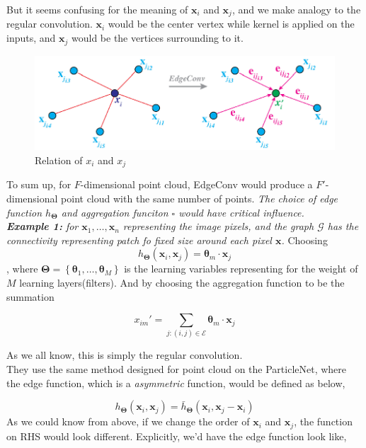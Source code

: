 \documentclass[12pt]{article}
\numberwithin{equation}{section}
\begin{document}
But it seems confusing for the meaning of $\mathbf{x}_i$ and $\mathbf{x}_j$, and we make analogy to the regular convolution. $\mathbf{x}_i$ would be the center vertex while kernel is applied on the inputs, and $\mathbf{x}_j$ would be the vertices surrounding to it.

\begin{figure}[H]
    \centering
    \includegraphics[width=0.75\linewidth]{x_ix_j.png}
    \caption{Relation of $x_i$ and $x_j$}
    \label{1}
\end{figure}

To sum up, for $F$-dimensional point cloud, EdgeConv would produce a $F'$-dimensional point cloud with the same number of points. \textit{The choice of edge function $h_{\pmb{\Theta}}$ and aggregation funciton $\square$ would have critical influence.}
\\
\indent \textit{\textbf{Example 1:} for $\mathbf{x}_1, \hdots, \mathbf{x}_n$ representing the image pixels, and the graph $\mathcal{G}$ has the connectivity representing patch fo fixed size around each pixel $\mathbf{x}$.} Choosing \[h_{\pmb{\Theta}}(\mathbf{x}_i, \mathbf{x}_j) = {\pmb{\theta}_m}\cdot\mathbf{x}_j\], where $\pmb{\Theta} = \left\{\pmb{\theta}_1, \hdots, \pmb{\theta}_M\right\}$ is the learning variables representing for the weight of $M$ learning layers(filters).
And by choosing the aggregation function to be the summation

\begin{equation}
    x_{im}' = \sum_{j: (i, j) \in \mathcal{E}}{\pmb{\theta}_m \cdot \mathbf{x}_j}
\end{equation}

As we all know, this is simply the regular convolution. 
\\
\indent They use the same method designed for point cloud on the ParticleNet, where the edge function, which is a \textit{asymmetric} function, would be defined as below,

\begin{equation}
    h_{\pmb{\Theta}}(\mathbf{x}_i, \mathbf{x}_j) = \bar{h}_{\pmb{\Theta}}(\mathbf{x}_i, \mathbf{x}_j - \mathbf{x}_i)
\end{equation}
As we could know from above, if we change the order of $\mathbf{x}_i$ and $\mathbf{x}_j$, the function on RHS would look different. Explicitly, we'd have the edge function look like,
\end{document}
